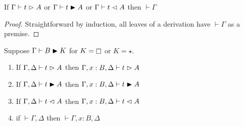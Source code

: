 
\begin{lemma}
    If $\Gamma \vdash t \vartriangleright A$ or $\Gamma \vdash t \blacktriangleright A$ or $\Gamma \vdash t \vartriangleleft A$ then $\vdash \Gamma$
    \label{lem:2:ctx_wf}
\end{lemma}
\begin{proof}
    Straightforward by induction, all leaves of a derivation have $\vdash \Gamma$ as a premise.
\end{proof}

\begin{lemma}[Weakening]
    Suppose $\Gamma \vdash B \blacktriangleright K$ for $K = \kind$ or $K = \star$.
    \begin{enumerate}
        \item If $\Gamma, \Delta \vdash t \vartriangleright A$ then $\Gamma, x : B, \Delta \vdash t \vartriangleright A$
        \item If $\Gamma, \Delta \vdash t \blacktriangleright A$ then $\Gamma, x : B, \Delta \vdash t \blacktriangleright A$
        \item If $\Gamma, \Delta \vdash t \vartriangleleft A$ then $\Gamma, x : B, \Delta \vdash t \vartriangleleft A$
        \item if $\vdash \Gamma, \Delta$ then $\vdash \Gamma, x : B, \Delta$
    \end{enumerate}
    \label{lem:2:weaken}
\end{lemma}
